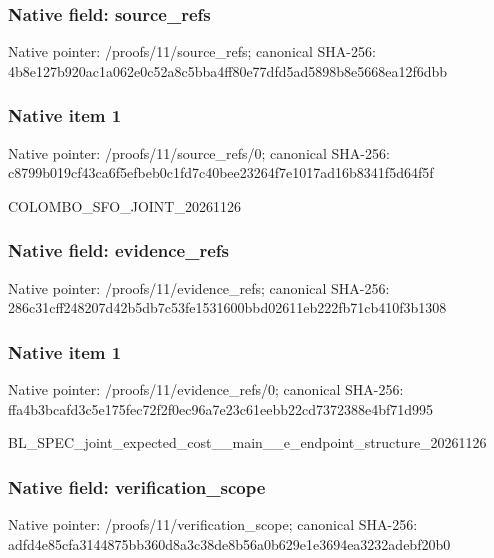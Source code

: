 \documentclass[10pt,a4paper]{article}
\begin{document}
\subsubsection{Native field: source\_refs}


Native pointer: /proofs/11/source\_refs; canonical SHA-256: 4b8e127b920ac1a062e0c52a\allowbreak{}8c5bba4ff80e77dfd5ad5898\allowbreak{}b8e5668ea12f6dbb



\subsubsection{Native item 1}


Native pointer: /proofs/11/source\_refs/0; canonical SHA-256: c8799b019cf43ca6f5efbeb0\allowbreak{}c1fd7c40bee23264f7e1017a\allowbreak{}d16b8341f5d64f5f


COLOMBO\_SFO\_JOINT\_20261126


\subsubsection{Native field: evidence\_refs}


Native pointer: /proofs/11/evidence\_refs; canonical SHA-256: 286c31cff248207d42b5db7c\allowbreak{}53fe1531600bbd02611eb222\allowbreak{}fb71cb410f3b1308



\subsubsection{Native item 1}


Native pointer: /proofs/11/evidence\_refs/0; canonical SHA-256: ffa4b3bcafd3c5e175fec72f\allowbreak{}2f0ec96a7e23c61eebb22cd7\allowbreak{}372388e4bf71d995


BL\_SPEC\_joint\_expected\_c\allowbreak{}ost\_\_main\_\_e\_endpoint\_st\allowbreak{}ructure\_20261126


\subsubsection{Native field: verification\_scope}


Native pointer: /proofs/11/verification\_scope; canonical SHA-256: adfd4e85cfa3144875bb360d\allowbreak{}8a3c38de8b56a0b629e1e369\allowbreak{}4ea3232adebf20b0
\end{document}

